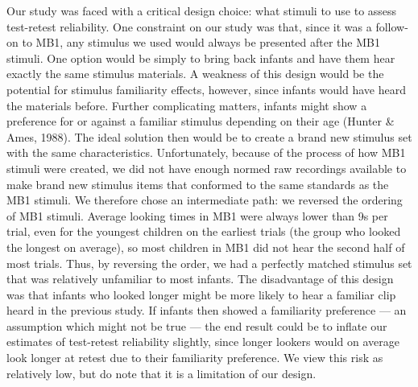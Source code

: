 \documentclass[
  man,floatsintext]{apa6}
\begin{document}
Our study was faced with a critical design choice: what stimuli to use to assess test-retest reliability.
One constraint on our study was that, since it was a follow-on to MB1, any stimulus we used would always be presented after the MB1 stimuli.
One option would be simply to bring back infants and have them hear exactly the same stimulus materials.
A weakness of this design would be the potential for stimulus familiarity effects, however, since infants would have heard the materials before.
Further complicating matters, infants might show a preference for or against a familiar stimulus depending on their age (Hunter \& Ames, 1988).
The ideal solution then would be to create a brand new stimulus set with the same characteristics.
Unfortunately, because of the process of how MB1 stimuli were created, we did not have enough normed raw recordings available to make brand new stimulus items that conformed to the same standards as the MB1 stimuli. We therefore chose an intermediate path: we reversed the ordering of MB1 stimuli. Average looking times in MB1 were always lower than 9s per trial, even for the youngest children on the earliest trials (the group who looked the longest on average), so most children in MB1 did not hear the second half of most trials.
Thus, by reversing the order, we had a perfectly matched stimulus set that was relatively unfamiliar to most infants.
The disadvantage of this design was that infants who looked longer might be more likely to hear a familiar clip heard in the previous study.
If infants then showed a familiarity preference --- an assumption which might not be true --- the end result could be to inflate our estimates of test-retest reliability slightly, since longer lookers would on average look longer at retest due to their familiarity preference. We view this risk as relatively low, but do note that it is a limitation of our design.
\end{document}
